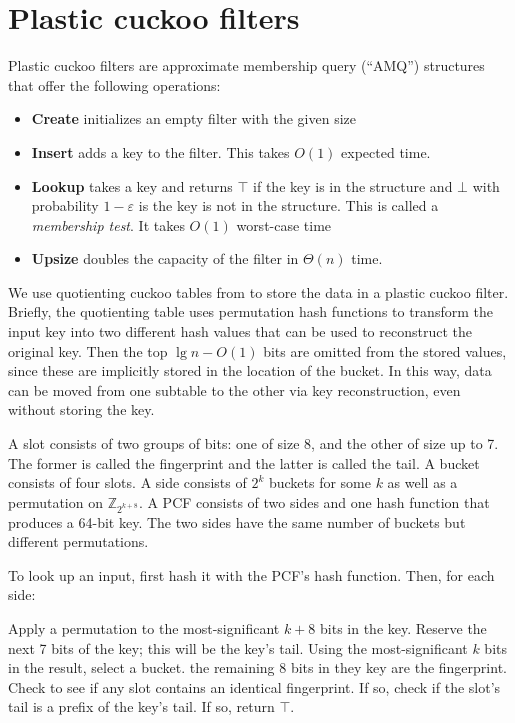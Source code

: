\documentclass[letterpaper, 11pt]{article}
\newcommand{\ints}{\mathbb{Z}}
\begin{document}
\section{Plastic cuckoo filters}

Plastic cuckoo filters are approximate membership query (``AMQ'') structures that offer the following operations:

\begin{itemize}
\item {\bf Create} initializes an empty filter with the given size
\item {\bf Insert} adds a key to the filter.
  This takes $O(1)$ expected time.
\item {\bf Lookup} takes a key and returns $\top$ if the key is in the structure and $\bot$ with probability $1-\varepsilon$ is the key is not in the structure.
  This is called a {\em membership test}.
  It takes $O(1)$ worst-case time
\item {\bf Upsize} doubles the capacity of the filter in $\Theta(n)$ time.
\end{itemize}

We use quotienting cuckoo tables from \cite{backyard} to store the data in a plastic cuckoo filter.
Briefly, the quotienting table uses permutation hash functions to transform the input key into two different hash values that can be used to reconstruct the original key.
Then the top $\lg n - O(1)$ bits are omitted from the stored values, since these are implicitly stored in the location of the bucket.
In this way, data can be moved from one subtable to the other via key reconstruction, even without storing the key.

A slot consists of two groups of bits: one of size 8, and the other of size up to 7.
The former is called the fingerprint and the latter is called the tail.
A bucket consists of four slots.
A side consists of $2^k$ buckets for some $k$ as well as a permutation on $\ints_{2^{k+8}}$.
A PCF consists of two sides and one hash function that produces a 64-bit key.
The two sides have the same number of buckets but different permutations.

To look up an input, first hash it with the PCF's hash function.
Then, for each side:

Apply a permutation to the most-significant $k+8$ bits in the key.
Reserve the next 7 bits of the key; this will be the key's tail.
Using the most-significant $k$ bits in the result, select a bucket.
the remaining 8 bits in they key are the fingerprint.
Check to see if any slot contains an identical fingerprint.
If so, check if the slot's tail is a prefix of the key's tail.
If so, return $\top$.
\end{document}
